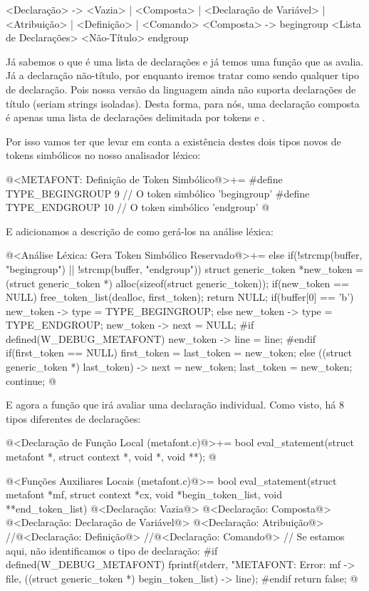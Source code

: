 \alinhaverbatim
<Declaração> -> <Vazia> | <Composta> | <Declaração de Variável> |
                <Atribuição> | <Definição> | <Comando>
<Composta> -> begingroup <Lista de Declarações> <Não-Título> endgroup
\alinhanormal

Já sabemos o que é uma lista de declarações e já temos uma função que
as avalia. Já a declaração não-título, por enquanto iremos tratar como
sendo qualquer tipo de declaração. Pois nossa versão da linguagem
ainda não suporta declarações de título (seriam strings
isoladas). Desta forma, para nós, uma declaração composta é apenas uma
lista de declarações delimitada por tokens 
e .

Por isso vamos ter que levar em conta a existência destes dois tipos
novos de tokens simbólicos no nosso analisador léxico:

\iniciocodigo
@<METAFONT: Definição de Token Simbólico@>+=
#define TYPE_BEGINGROUP             9 // O token simbólico 'begingroup'
#define TYPE_ENDGROUP              10 // O token simbólico 'endgroup'
@
\fimcodigo

E adicionamos a descrição de como gerá-los na análise léxica:

\iniciocodigo
@<Análise Léxica: Gera Token Simbólico Reservado@>+=
else if(!strcmp(buffer, "begingroup") || !strcmp(buffer, "endgroup")){
  struct generic_token *new_token =
     (struct generic_token *) alloc(sizeof(struct generic_token));
  if(new_token == NULL){
    free_token_list(dealloc, first_token);
    return NULL;
  }
  if(buffer[0] == 'b')
    new_token -> type = TYPE_BEGINGROUP;
  else
    new_token -> type = TYPE_ENDGROUP;
  new_token -> next = NULL;
#if defined(W_DEBUG_METAFONT)
  new_token -> line = line;
#endif
  if(first_token == NULL)
    first_token = last_token = new_token;
  else{
    ((struct generic_token *) last_token) -> next = new_token;
    last_token = new_token;
  }
  continue;
}
@
\fimcodigo

E agora a função que irá avaliar uma declaração individual. Como
visto, há 8 tipos diferentes de declarações:

\iniciocodigo
@<Declaração de Função Local (metafont.c)@>+=
bool eval_statement(struct metafont *, struct context *, void *, void **);
@
\fimcodigo

\iniciocodigo
@<Funções Auxiliares Locais (metafont.c)@>=
bool eval_statement(struct metafont *mf, struct context *cx,
                     void *begin_token_list, void **end_token_list){
  @<Declaração: Vazia@>
  @<Declaração: Composta@>
  @<Declaração: Declaração de Variável@>
  @<Declaração: Atribuição@>
  //@<Declaração: Definição@> 
  //@<Declaração: Comando@>
  // Se estamos aqui, não identificamos o tipo de declaração:
#if defined(W_DEBUG_METAFONT)
    fprintf(stderr, "METAFONT: Error: %
            mf -> file,
            ((struct generic_token *) begin_token_list) -> line);
#endif
  return false;
}
@
\fimcodigo

